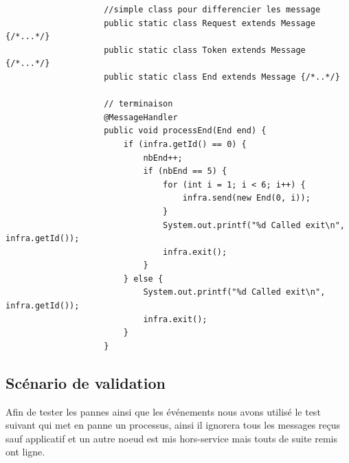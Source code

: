 \documentclass{article}
\begin{document}
\begin{lstlisting}
					//simple class pour differencier les message
					public static class Request extends Message {/*...*/}				
					public static class Token extends Message {/*...*/}
					public static class End extends Message {/*..*/}
				
					// terminaison
					@MessageHandler
					public void processEnd(End end) {
						if (infra.getId() == 0) {
							nbEnd++;
							if (nbEnd == 5) {
								for (int i = 1; i < 6; i++) {
									infra.send(new End(0, i));
								}
								System.out.printf("%d Called exit\n", infra.getId());
								infra.exit();
							}
						} else {
							System.out.printf("%d Called exit\n", infra.getId());
							infra.exit();
						}
					}	
			\end{lstlisting}
			\subsection{Scénario de validation}
			Afin de tester les pannes ainsi que les événements nous avons utilisé le test suivant qui met en panne un processus, ainsi il ignorera tous les messages reçus sauf applicatif et un autre noeud est mis hors-service mais touts de suite remis ont ligne.
\end{document}
